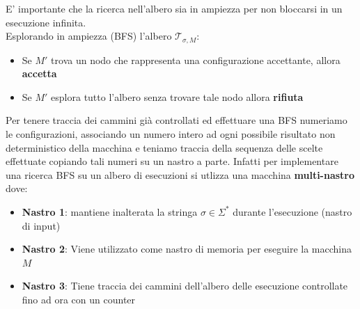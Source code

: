 \noindent E' importante che la ricerca nell'albero sia in ampiezza per non bloccarsi in un esecuzione infinita.\\
Esplorando in ampiezza (BFS) l'albero $\mathcal{T}_{\sigma,M}$:
\begin{itemize}
    \item Se $M'$ trova un nodo che rappresenta una configurazione accettante, allora \textbf{accetta}
    \item Se $M'$ esplora tutto l'albero senza trovare tale nodo allora \textbf{rifiuta}
\end{itemize}
Per tenere traccia dei cammini già controllati ed effettuare una BFS numeriamo le configurazioni, associando un numero intero ad ogni possibile risultato non deterministico della macchina e teniamo traccia 
della sequenza delle scelte effettuate copiando tali numeri su un nastro a parte. Infatti per implementare una ricerca BFS su un albero di esecuzioni si utlizza una macchina \textbf{multi-nastro} dove:
\begin{itemize}
    \item \textbf{Nastro 1}: mantiene inalterata la stringa $\sigma \in \Sigma^*$ durante l'esecuzione (nastro di input)
    \item \textbf{Nastro 2}: Viene utilizzato come nastro di memoria per eseguire la macchina $M$
    \item \textbf{Nastro 3}: Tiene traccia dei cammini dell'albero delle esecuzione controllate fino ad ora con un counter
\end{itemize}

